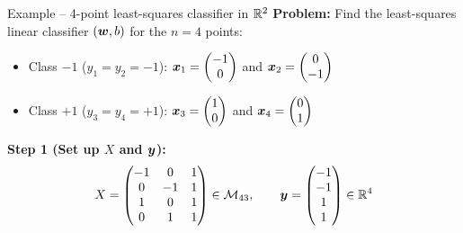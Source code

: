 \documentclass[aspectratio=169]{beamer}\usepackage[]{graphicx}\usepackage[]{xcolor}
\begin{document}
\begin{frame}{Example -- 4-point least-squares classifier in $\mathbb{R}^2$}
    \textbf{Problem:} Find the least-squares linear classifier $(\bm{w}, b)$ for the $n = 4$ points:
    \begin{itemize}
        \item Class $-1$ ($y_1 = y_2 = -1$): $\bm{x}_1 = \begin{pmatrix} -1 \\ 0 \end{pmatrix}$ and $\bm{x}_2 = \begin{pmatrix} 0 \\ -1 \end{pmatrix}$
        \item Class $+1$ ($y_3 = y_4 = +1$): $\bm{x}_3 = \begin{pmatrix} 1 \\ 0 \end{pmatrix}$ and $\bm{x}_4 = \begin{pmatrix} 0 \\ 1 \end{pmatrix}$
    \end{itemize}
    \vfill
    \textbf{Step 1 (Set up $X$ and $\bm{y}$):}
    \[
        X = \begin{pmatrix}
            -1 & 0 & 1 \\
             0 & -1 & 1 \\
             1 & 0 & 1 \\
             0 & 1 & 1
        \end{pmatrix} \in \mathcal{M}_{43}, \qquad
        \bm{y} = \begin{pmatrix} -1 \\ -1 \\ 1 \\ 1 \end{pmatrix} \in \mathbb{R}^4
    \]
\end{frame}
\end{document}
